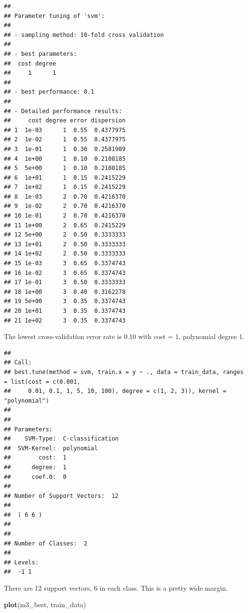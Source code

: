 \documentclass[]{book}
\newenvironment{Shaded}{\begin{snugshade}}{\end{snugshade}}
\newcommand{\KeywordTok}[1]{\textcolor[rgb]{0.13,0.29,0.53}{\textbf{#1}}}
\newcommand{\NormalTok}[1]{#1}
\newcommand{\OperatorTok}[1]{\textcolor[rgb]{0.81,0.36,0.00}{\textbf{#1}}}
\newcommand{\StringTok}[1]{\textcolor[rgb]{0.31,0.60,0.02}{#1}}
\begin{document}
\begin{verbatim}
## 
## Parameter tuning of 'svm':
## 
## - sampling method: 10-fold cross validation 
## 
## - best parameters:
##  cost degree
##     1      1
## 
## - best performance: 0.1 
## 
## - Detailed performance results:
##     cost degree error dispersion
## 1  1e-03      1  0.55  0.4377975
## 2  1e-02      1  0.55  0.4377975
## 3  1e-01      1  0.30  0.2581989
## 4  1e+00      1  0.10  0.2108185
## 5  5e+00      1  0.10  0.2108185
## 6  1e+01      1  0.15  0.2415229
## 7  1e+02      1  0.15  0.2415229
## 8  1e-03      2  0.70  0.4216370
## 9  1e-02      2  0.70  0.4216370
## 10 1e-01      2  0.70  0.4216370
## 11 1e+00      2  0.65  0.2415229
## 12 5e+00      2  0.50  0.3333333
## 13 1e+01      2  0.50  0.3333333
## 14 1e+02      2  0.50  0.3333333
## 15 1e-03      3  0.65  0.3374743
## 16 1e-02      3  0.65  0.3374743
## 17 1e-01      3  0.50  0.3333333
## 18 1e+00      3  0.40  0.3162278
## 19 5e+00      3  0.35  0.3374743
## 20 1e+01      3  0.35  0.3374743
## 21 1e+02      3  0.35  0.3374743
\end{verbatim}

The lowest cross-validation error rate is 0.10 with cost = 1, polynomial degree 1.

\begin{Shaded}
\end{Shaded}

\begin{verbatim}
## 
## Call:
## best.tune(method = svm, train.x = y ~ ., data = train_data, ranges = list(cost = c(0.001, 
##     0.01, 0.1, 1, 5, 10, 100), degree = c(1, 2, 3)), kernel = "polynomial")
## 
## 
## Parameters:
##    SVM-Type:  C-classification 
##  SVM-Kernel:  polynomial 
##        cost:  1 
##      degree:  1 
##      coef.0:  0 
## 
## Number of Support Vectors:  12
## 
##  ( 6 6 )
## 
## 
## Number of Classes:  2 
## 
## Levels: 
##  -1 1
\end{verbatim}

There are 12 support vectors, 6 in each class. This is a pretty wide margin.

\begin{Shaded}
\begin{Highlighting}[]
\KeywordTok{plot}\NormalTok{(m3_best, train_data)}
\end{Highlighting}
\end{Shaded}
\end{document}
